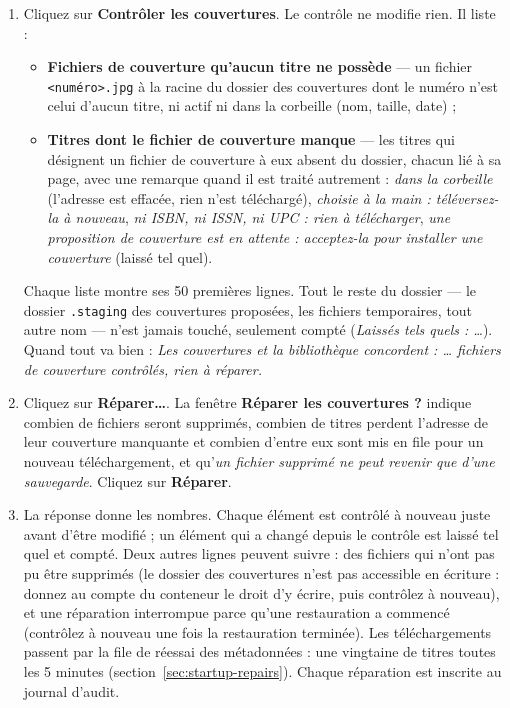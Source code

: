 \begin{enumerate}
  \item Cliquez sur \textbf{Contrôler les couvertures}. Le contrôle ne
        modifie rien. Il liste :
        \begin{itemize}
          \item \textbf{Fichiers de couverture qu'aucun titre ne
                possède} --- un fichier \texttt{<numéro>.jpg} à la
                racine du dossier des couvertures dont le numéro n'est
                celui d'aucun titre, ni actif ni dans la corbeille (nom,
                taille, date) ;
          \item \textbf{Titres dont le fichier de couverture manque} ---
                les titres qui désignent un fichier de couverture à eux
                absent du dossier, chacun lié à sa page, avec une
                remarque quand il est traité autrement : \emph{dans la
                corbeille} (l'adresse est effacée, rien n'est
                téléchargé), \emph{choisie à la main : téléversez-la à
                nouveau}, \emph{ni ISBN, ni ISSN, ni UPC : rien à
                télécharger}, \emph{une proposition de couverture est en
                attente : acceptez-la pour installer une couverture}
                (laissé tel quel).
        \end{itemize}
        Chaque liste montre ses 50 premières lignes. Tout le reste du
        dossier --- le dossier \texttt{.staging} des couvertures
        proposées, les fichiers temporaires, tout autre nom --- n'est
        jamais touché, seulement compté (\emph{Laissés tels quels :
        \dots}). Quand tout va bien : \emph{Les couvertures et la
        bibliothèque concordent : \dots{} fichiers de couverture
        contrôlés, rien à réparer.}
  \item Cliquez sur \textbf{Réparer…}. La fenêtre \textbf{Réparer les
        couvertures ?} indique combien de fichiers seront supprimés,
        combien de titres perdent l'adresse de leur couverture manquante
        et combien d'entre eux sont mis en file pour un nouveau
        téléchargement, et qu'\emph{un fichier supprimé ne peut revenir
        que d'une sauvegarde}. Cliquez sur \textbf{Réparer}.
  \item La réponse donne les nombres. Chaque élément est contrôlé à
        nouveau juste avant d'être modifié ; un élément qui a changé
        depuis le contrôle est laissé tel quel et compté. Deux autres
        lignes peuvent suivre : des fichiers qui n'ont pas pu être
        supprimés (le dossier des couvertures n'est pas accessible en
        écriture : donnez au compte du conteneur le droit d'y écrire,
        puis contrôlez à nouveau), et une réparation interrompue parce
        qu'une restauration a commencé (contrôlez à nouveau une fois la
        restauration terminée). Les
        téléchargements passent par la file de réessai des
        métadonnées : une vingtaine de titres toutes les 5 minutes
        (section~\ref{sec:startup-repairs}). Chaque réparation est
        inscrite au journal d'audit.
\end{enumerate}

